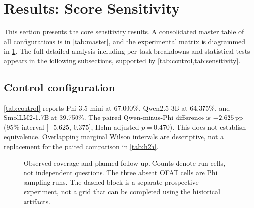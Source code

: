 \section{Results: Score Sensitivity}
\label{sec:results}

This section presents the core sensitivity results. A consolidated master
table of all configurations is in \cref{tab:master}, and the experimental
matrix is diagrammed in \cref{fig:matrix}. The full detailed analysis
including per-task breakdowns and statistical tests appears in the
following subsections, supported by \cref{tab:control,tab:sensitivity}.



\subsection{Control configuration}
\label{sec:control}

\cref{tab:control} reports Phi-3.5-mini at 67.000\%, Qwen2.5-3B at
64.375\%, and SmolLM2-1.7B at 39.750\%. The paired Qwen-minus-Phi
difference is $-2.625$\,pp (95\% interval [$-5.625$, $0.375$],
Holm-adjusted $p=0.470$). This does not establish equivalence.
Overlapping marginal Wilson intervals are descriptive, not a replacement
for the paired comparison in \cref{tab:h2h}.



\begin{figure}[t]
\centering
{}
\caption{Observed coverage and planned follow-up. Counts denote run cells,
not independent questions. The three absent OFAT cells are Phi sampling
runs. The dashed block is a separate prospective experiment, not a grid
that can be completed using the historical artifacts.}
\label{fig:matrix}
\end{figure}

